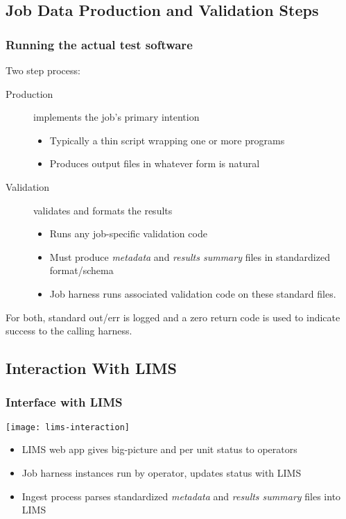 \documentclass[xcolor=dvipsnames]{beamer}
\begin{document}
\subsection{Job Data Production and Validation Steps}

\begin{frame}
  \frametitle{Running the actual test software}

  Two step process:
  \begin{description}
  \item[Production] implements the job's primary intention
    \begin{itemize}
    \item Typically a thin script wrapping one or more programs
    \item Produces output files in whatever form is natural
    \end{itemize}
  \item[Validation] validates and formats the results
    \begin{itemize}
    \item Runs any job-specific validation code
    \item Must produce \textit{metadata} and \textit{results summary}
      files in standardized format/schema
    \item Job harness runs associated validation code on these standard
      files.
    \end{itemize}
  \end{description}

  For both, standard out/err is logged and a zero return code is used to
  indicate success to the calling harness.

\end{frame}

\subsection{Interaction With LIMS}

\begin{frame}
  \frametitle{Interface with LIMS}
  \begin{center}
    \texttt{[image: lims-interaction]}    
  \end{center}
  \begin{itemize}
  \item LIMS web app gives big-picture and per unit status to operators
  \item Job harness instances run by operator, updates status with LIMS
  \item Ingest process parses standardized \textit{metadata} and
    \textit{results summary} files into LIMS
  \end{itemize}
\end{frame}
\end{document}
